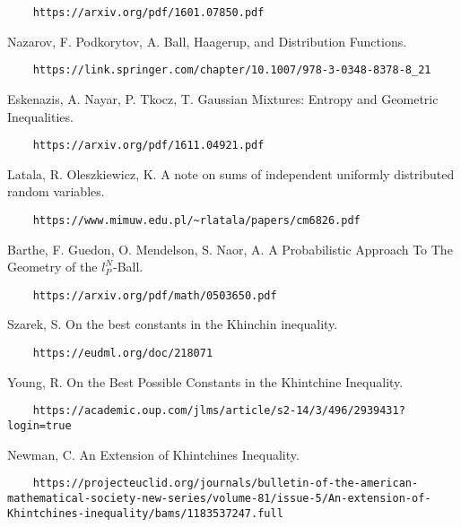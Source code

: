 \documentclass[10pt]{article}
\newcommand{\1}{\textbf{1}}
\theoremstyle{remark}
\theoremstyle{definition}
\begin{document}
\begin{thebibliography}{9}
\begin{verbatim}
	https://arxiv.org/pdf/1601.07850.pdf
\end{verbatim}

 Nazarov, F. Podkorytov, A. Ball, Haagerup, and Distribution Functions. 

\begin{verbatim}
	https://link.springer.com/chapter/10.1007/978-3-0348-8378-8_21
\end{verbatim}

 Eskenazis, A. Nayar, P. Tkocz, T. Gaussian Mixtures: Entropy and Geometric Inequalities.

\begin{verbatim}
	https://arxiv.org/pdf/1611.04921.pdf
\end{verbatim}

 Latala, R. Oleszkiewicz, K. A note on sums of independent uniformly distributed random variables.

\begin{verbatim}
	https://www.mimuw.edu.pl/~rlatala/papers/cm6826.pdf
\end{verbatim}

 Barthe, F. Guedon, O. Mendelson, S. Naor, A. A Probabilistic Approach To The Geometry of the $l_P^N$-Ball.

\begin{verbatim}
	https://arxiv.org/pdf/math/0503650.pdf
\end{verbatim}

 Szarek, S. On the best constants in the Khinchin inequality.

\begin{verbatim}
	https://eudml.org/doc/218071
\end{verbatim}

 Young, R. On the Best Possible Constants in the Khintchine Inequality.

\begin{verbatim}
	https://academic.oup.com/jlms/article/s2-14/3/496/2939431?login=true
\end{verbatim}

 Newman, C. An Extension of Khintchines Inequality. 

\begin{verbatim}
	https://projecteuclid.org/journals/bulletin-of-the-american-mathematical-society-new-series/volume-81/issue-5/An-extension-of-Khintchines-inequality/bams/1183537247.full
\end{verbatim}


\end{thebibliography}
\end{document}
